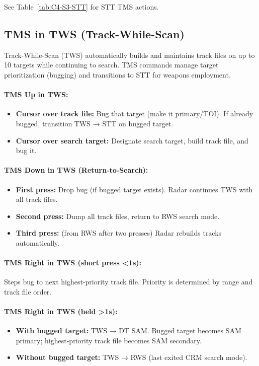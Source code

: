 \documentclass[11pt, a4paper, twoside]{report}
\begin{document}
See Table~\ref{tab:C4-S3-STT} for STT TMS actions.

\subsection{TMS in TWS (Track-While-Scan)}
\label{sec:C4-S3-S3}

Track-While-Scan (TWS) automatically builds and maintains track files on up to 10 targets while continuing to search. TMS commands manage target prioritization (bugging) and transitions to STT for weapons employment.

\paragraph{TMS Up in TWS:}
\begin{itemize}
    \item \textbf{Cursor over track file:} Bug that target (make it primary/TOI). If already bugged, transition TWS → STT on bugged target.
    \item \textbf{Cursor over search target:} Designate search target, build track file, and bug it.
\end{itemize}

\paragraph{TMS Down in TWS (Return-to-Search):}
\begin{itemize}
    \item \textbf{First press:} Drop bug (if bugged target exists). Radar continues TWS with all track files.
    \item \textbf{Second press:} Dump all track files, return to RWS search mode.
    \item \textbf{Third press:} (from RWS after two presses) Radar rebuilds tracks automatically.
\end{itemize}

\paragraph{TMS Right in TWS (short press <1s):}
Steps bug to next highest-priority track file. Priority is determined by range and track file order.

\paragraph{TMS Right in TWS (held >1s):}
\begin{itemize}
    \item \textbf{With bugged target:} TWS → DT SAM. Bugged target becomes SAM primary; highest-priority track file becomes SAM secondary.
    \item \textbf{Without bugged target:} TWS → RWS (last exited CRM search mode).
\end{itemize}
\end{document}
